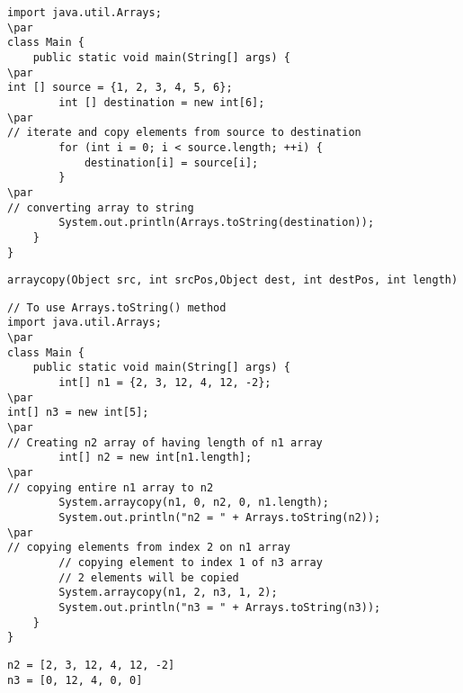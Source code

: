 \documentclass{book}
\def\lthtmlcheckvsize{\ifdim\ht\sizebox<\vsize 
  \ifdim\wd\sizebox<\hsize\expandafter\hfill\fi \expandafter\vfill
  \else\expandafter\vss\fi}%
\begin{document}
{\newpage\clearpage
{}%
\begin{lstlisting}
import java.util.Arrays;
\par
class Main {
    public static void main(String[] args) {
\par
int [] source = {1, 2, 3, 4, 5, 6};
        int [] destination = new int[6];
\par
// iterate and copy elements from source to destination
        for (int i = 0; i < source.length; ++i) {
            destination[i] = source[i];
        }
\par
// converting array to string
        System.out.println(Arrays.toString(destination));
    }
}
\end{lstlisting}%
\lthtmlfigureZ
\lthtmlcheckvsize\clearpage}

{\newpage\clearpage
{}%
\begin{lstlisting}
arraycopy(Object src, int srcPos,Object dest, int destPos, int length)
\end{lstlisting}%
\lthtmlfigureZ
\lthtmlcheckvsize\clearpage}

{\newpage\clearpage
{}%
\begin{lstlisting}
// To use Arrays.toString() method
import java.util.Arrays;
\par
class Main {
    public static void main(String[] args) {
        int[] n1 = {2, 3, 12, 4, 12, -2};
\par
int[] n3 = new int[5];
\par
// Creating n2 array of having length of n1 array
        int[] n2 = new int[n1.length];
\par
// copying entire n1 array to n2
        System.arraycopy(n1, 0, n2, 0, n1.length);
        System.out.println("n2 = " + Arrays.toString(n2));  
\par
// copying elements from index 2 on n1 array
        // copying element to index 1 of n3 array
        // 2 elements will be copied
        System.arraycopy(n1, 2, n3, 1, 2);
        System.out.println("n3 = " + Arrays.toString(n3));  
    }
}
\end{lstlisting}%
\lthtmlfigureZ
\lthtmlcheckvsize\clearpage}

{\newpage\clearpage
{}%
\begin{lstlisting}
n2 = [2, 3, 12, 4, 12, -2]
n3 = [0, 12, 4, 0, 0]
\end{lstlisting}%
\lthtmlfigureZ
\lthtmlcheckvsize\clearpage}
\end{document}
